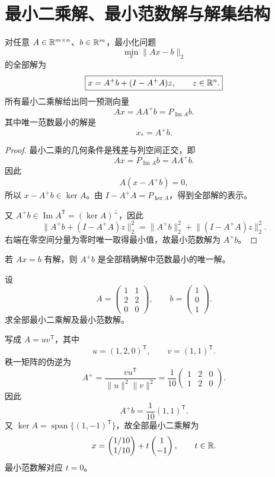 \section{最小二乘解、最小范数解与解集结构}

\begin{theorem}[全部最小二乘解]
对任意 $A\in\mathbb{R}^{m\times n}$、$b\in\mathbb{R}^m$，最小化问题
\[
\min_x\lVert Ax-b\rVert_2
\]
的全部解为
\[
\boxed{x=A^+b+(I-A^+A)z,
\qquad z\in\mathbb{R}^n.}
\]
所有最小二乘解给出同一预测向量
\[
Ax=AA^+b=P_{\operatorname{Im}A}b.
\]
其中唯一范数最小的解是
\[
x_*=A^+b.
\]
\end{theorem}
\begin{proof}
最小二乘的几何条件是残差与列空间正交，即
\[
Ax=P_{\operatorname{Im}A}b=AA^+b.
\]
因此
\[
A(x-A^+b)=0,
\]
所以 $x-A^+b\in\ker A$。由
$I-A^+A=P_{\ker A}$，得到全部解的表示。

又 $A^+b\in\operatorname{Im}A^{\mathsf T}=(\ker A)^\perp$，因此
\[
\lVert A^+b+(I-A^+A)z\rVert_2^2
=\lVert A^+b\rVert_2^2
 +\lVert(I-A^+A)z\rVert_2^2.
\]
右端在零空间分量为零时唯一取得最小值，故最小范数解为 $A^+b$。
\end{proof}

\begin{corollary}[相容方程的最小范数解]
若 $Ax=b$ 有解，则 $A^+b$ 是全部精确解中范数最小的唯一解。
\end{corollary}

\begin{example}[title={秩不足最小二乘}]
设
\[
A=\begin{pmatrix}1&1\\2&2\\0&0\end{pmatrix},
\qquad
b=\begin{pmatrix}1\\0\\1\end{pmatrix}.
\]
求全部最小二乘解及最小范数解。
\begin{solution}
写成 $A=uv^{\mathsf T}$，其中
\[
u=(1,2,0)^{\mathsf T},
\qquad
v=(1,1)^{\mathsf T}.
\]
秩一矩阵的伪逆为
\[
A^+=\frac{vu^{\mathsf T}}{\lVert u\rVert^2\lVert v\rVert^2}
=\frac1{10}\begin{pmatrix}1&2&0\\1&2&0\end{pmatrix}.
\]
因此
\[
A^+b=\frac1{10}(1,1)^{\mathsf T}.
\]
又 $\ker A=\operatorname{span}\{(1,-1)^{\mathsf T}\}$，故全部最小二乘解为
\[
x=\begin{pmatrix}1/10\\1/10\end{pmatrix}
+t\begin{pmatrix}1\\-1\end{pmatrix},
\qquad t\in\mathbb{R}.
\]
最小范数解对应 $t=0$。
\end{solution}
\end{example}

